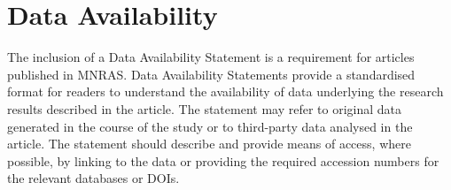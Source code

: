 \documentclass[fleqn,usenatbib]{mnras}
\begin{document}
\section*{Data Availability}

 
The inclusion of a Data Availability Statement is a requirement for articles published in MNRAS. Data Availability Statements provide a standardised format for readers to understand the availability of data underlying the research results described in the article. The statement may refer to original data generated in the course of the study or to third-party data analysed in the article. The statement should describe and provide means of access, where possible, by linking to the data or providing the required accession numbers for the relevant databases or DOIs.












\appendix
\end{document}
